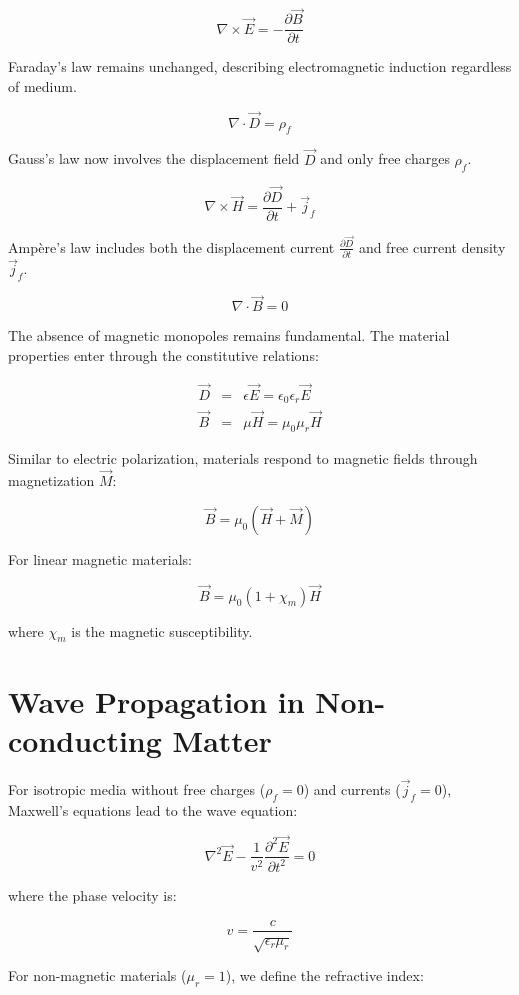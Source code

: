 \documentclass[
  a4paper,
]{book}
\begin{document}
\[
\nabla \times \vec{E}=-\frac{\partial \vec{B}}{\partial t}
\tag{ME.1}
\]

Faraday's law remains unchanged, describing electromagnetic induction
regardless of medium.

\[
\nabla\cdot\vec{D}=\rho_f
\tag{ME.2}
\]

Gauss's law now involves the displacement field \(\vec{D}\) and only
free charges \(\rho_f\).

\[
\nabla\times \vec{H}=\frac{\partial \vec{D}}{\partial t}+\vec{j}_f
\tag{ME.3}
\]

Ampère's law includes both the displacement current
\(\frac{\partial \vec{D}}{\partial t}\) and free current density
\(\vec{j}_f\).

\[
\nabla\cdot \vec{B}=0
\tag{ME.4}
\]

The absence of magnetic monopoles remains fundamental. The material
properties enter through the constitutive relations:

\begin{eqnarray}
\vec{D}&=&\epsilon \vec{E}=\epsilon_0 \epsilon_r\vec{E}\\
\vec{B}&=&\mu \vec{H}=\mu_0 \mu_r\vec{H}
\end{eqnarray}

Similar to electric polarization, materials respond to magnetic fields
through magnetization \(\vec{M}\):

\[
\vec{B}=\mu_0(\vec{H}+\vec{M})
\]

For linear magnetic materials:

\[
\vec{B}=\mu_0(1+\chi_m)\vec{H}
\]

where \(\chi_m\) is the magnetic susceptibility.

\section{Wave Propagation in Non-conducting
Matter}\label{wave-propagation-in-non-conducting-matter}

For isotropic media without free charges (\(\rho_f=0\)) and currents
(\(\vec{j}_f=0\)), Maxwell's equations lead to the wave equation:

\[
\nabla^2\vec{E}-\frac{1}{v^2} \frac{\partial^2\vec{E}}{\partial t^2}=0
\]

where the phase velocity is:

\[
v=\frac{c}{\sqrt{\epsilon_r\mu_r}}
\]

For non-magnetic materials (\(\mu_r=1\)), we define the refractive
index:
\end{document}
